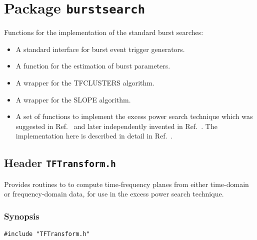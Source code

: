 \chapter{Package \texttt{burstsearch}}

Functions for the implementation of the standard burst searches:

\begin{itemize}

\item A standard interface for burst event trigger generators.

\item A function for the estimation of burst parameters.

\item A wrapper for the TFCLUSTERS algorithm.

\item A wrapper for the SLOPE algorithm.

\item A set of functions to implement the excess power search technique which was suggested in Ref.~\cite{fh:1998} and later independently invented in Ref.~\cite{acdhp:1999}.  The implementation here is described in detail in Ref.~\cite{abcf:2000}. 

\end{itemize}

\newpage

\newpage

\newpage

\newpage



\newpage
\section{Header \texttt{TFTransform.h}}
\label{s:TFTransform.h}

\noindent Provides routines to to compute time-frequency planes from either
time-domain or frequency-domain data, for use in the excess
power search technique.

\subsection*{Synopsis}
\begin{verbatim}
#include "TFTransform.h"
\end{verbatim}

